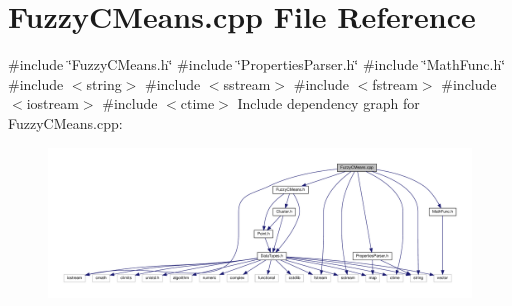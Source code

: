 \section{Fuzzy\+C\+Means.\+cpp File Reference}
\label{_fuzzy_c_means_8cpp}
{\ttfamily \#include \char`\"{}Fuzzy\+C\+Means.\+h\char`\"{}}\newline
{\ttfamily \#include \char`\"{}Properties\+Parser.\+h\char`\"{}}\newline
{\ttfamily \#include \char`\"{}Math\+Func.\+h\char`\"{}}\newline
{\ttfamily \#include $<$string$>$}\newline
{\ttfamily \#include $<$sstream$>$}\newline
{\ttfamily \#include $<$fstream$>$}\newline
{\ttfamily \#include $<$iostream$>$}\newline
{\ttfamily \#include $<$ctime$>$}\newline
Include dependency graph for Fuzzy\+C\+Means.\+cpp\+:
\nopagebreak
\begin{figure}[H]
\begin{center}
\leavevmode
\includegraphics[width=350pt]{_fuzzy_c_means_8cpp__incl}
\end{center}
\end{figure}
